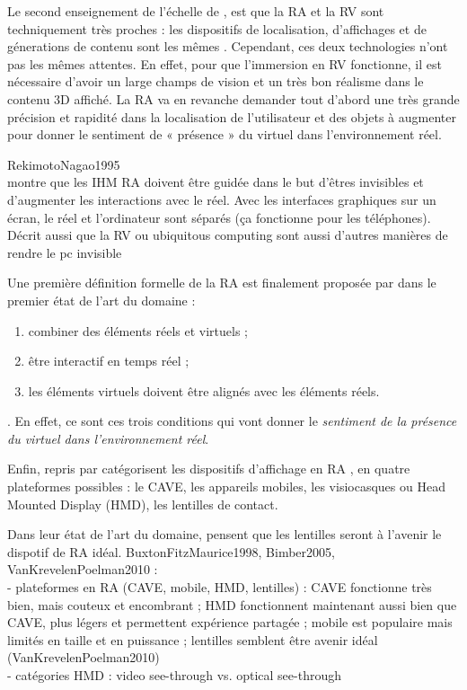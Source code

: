 Le second enseignement de l'échelle de \citeauthor{Milgram1994}, est que la RA et la RV sont techniquement très proches : les dispositifs de localisation, d'affichages et de génerations de contenu sont les mêmes \citep{Billinghurst2015}. Cependant, ces deux technologies n'ont pas les mêmes attentes. En effet, pour que l'immersion en RV fonctionne, il est nécessaire d'avoir un large champs de vision et un très bon réalisme dans le contenu 3D affiché. La RA va en revanche demander tout d'abord une très grande précision et rapidité dans la localisation de l'utilisateur et des objets à augmenter pour donner le sentiment de « présence » du virtuel dans l'environnement réel.


RekimotoNagao1995\\
montre que les IHM RA doivent être guidée dans le but d'êtres invisibles et d'augmenter les interactions avec le réel. Avec les interfaces graphiques sur un écran, le réel et l'ordinateur sont séparés (ça fonctionne pour les téléphones). Décrit aussi que la RV ou ubiquitous computing sont aussi d'autres manières de rendre le pc invisible

Une première définition formelle de la RA est finalement proposée par \cite{Azuma1997} dans le premier état de l'art du domaine :
\begin{enumerate}
  \item combiner des éléments réels et virtuels ;
  \item être interactif en temps réel ;
  \item les éléments virtuels doivent être alignés avec les éléments réels.
\end{enumerate}.
En effet, ce sont ces trois conditions qui vont donner le \emph{sentiment de la présence du virtuel dans l'environnement réel}. 

Enfin, \cite{BuxtonFitzMaurice1998} repris par \cite{Bimber2005} catégorisent les dispositifs d'affichage en RA , en quatre plateformes possibles : le CAVE, les appareils mobiles, les visiocasques ou Head Mounted Display (HMD), les lentilles de contact.

Dans leur état de l'art du domaine, \cite{VanKrevelenPoelman2010} pensent que les lentilles seront à l'avenir le dispotif de RA idéal.
BuxtonFitzMaurice1998, Bimber2005, VanKrevelenPoelman2010 :\\
- plateformes en RA (CAVE, mobile, HMD, lentilles) : CAVE fonctionne très bien, mais couteux et encombrant ; HMD fonctionnent maintenant aussi bien que CAVE, plus légers et permettent expérience partagée ; mobile est populaire mais limités en taille et en puissance ; lentilles semblent être avenir idéal (VanKrevelenPoelman2010)\\
- catégories HMD : video see-through vs. optical see-through


